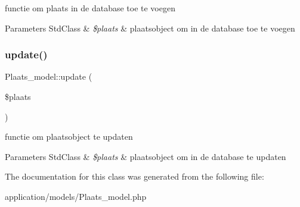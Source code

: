 functie om plaats in de database toe te voegen 
\begin{DoxyParams}[1]{Parameters}
Std\+Class & {\em \$plaats} & plaatsobject om in de database toe te voegen \\
\hline
\end{DoxyParams}
\mbox{\label{class_plaats__model_ac03a8dd14ad6cf143baca5f054ab94a1}} 
\subsubsection{\texorpdfstring{update()}{update()}}
{\footnotesize\ttfamily Plaats\+\_\+model\+::update (\begin{DoxyParamCaption}\item[{}]{\$plaats }\end{DoxyParamCaption})}

functie om plaatsobject te updaten 
\begin{DoxyParams}[1]{Parameters}
Std\+Class & {\em \$plaats} & plaatsobject om in de database te updaten \\
\hline
\end{DoxyParams}


The documentation for this class was generated from the following file\+:\begin{DoxyCompactItemize}
\item 
application/models/Plaats\+\_\+model.\+php\end{DoxyCompactItemize}
